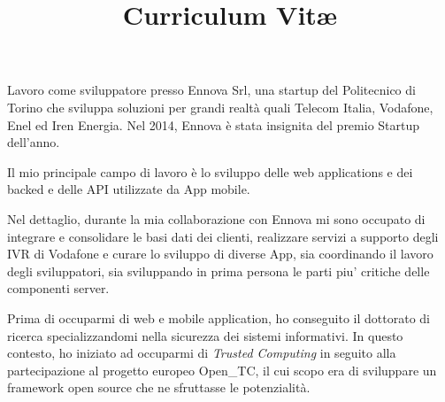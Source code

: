 \documentclass[a4paper,sans]{moderncv} %
\title{Curriculum Vit\ae}
\newcommand{\otc}{Open\_TC}
\begin{document}
\maketitle

\justify
Lavoro come sviluppatore presso Ennova Srl, una startup del Politecnico
di Torino che sviluppa soluzioni
per grandi realt\`a quali Telecom Italia, Vodafone, Enel ed Iren Energia.
Nel 2014, Ennova \`e stata insignita del premio Startup dell'anno.


Il mio principale campo di lavoro \`e lo sviluppo delle web applications e
dei backed e delle API utilizzate da App mobile.


    Nel dettaglio, durante la mia collaborazione con Ennova mi sono occupato
    di integrare e consolidare le basi dati dei clienti,
    realizzare servizi a supporto degli IVR di Vodafone
    e curare lo sviluppo di diverse App,
    sia coordinando il lavoro degli sviluppatori,
    sia sviluppando in prima persona le parti piu' critiche delle componenti server.


Prima di occuparmi di web e mobile application,
      ho conseguito il dottorato di ricerca specializzandomi nella sicurezza dei sistemi informativi.
      In questo contesto, ho iniziato ad occuparmi di \emph{Trusted Computing} in
      seguito alla partecipazione al progetto europeo \otc, il cui scopo era
      di sviluppare un framework open source che ne sfruttasse le potenzialit\`a.
\end{document}
